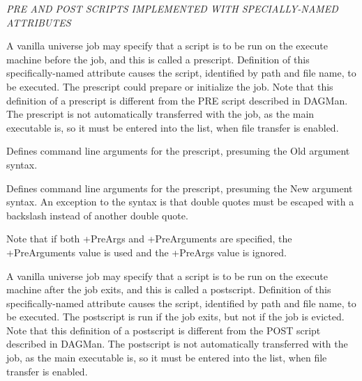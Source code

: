 \emph{PRE AND POST SCRIPTS IMPLEMENTED WITH SPECIALLY-NAMED ATTRIBUTES}
\begin{description} 


\label{man-condor-submit-prescript}
\item[+PreCmd = \texttt{"}$<$executable$>$\texttt{"}]
A vanilla universe job may specify that a script is to be run 
on the execute machine before the job, and this is called a prescript.
Definition of this specifically-named attribute causes the script,
identified by path and file name, to be executed. 
The prescript could prepare or initialize the job.
Note that this definition of a prescript is different from the PRE script 
described in DAGMan.
The prescript is not automatically transferred with the job,
as the main executable is, 
so it must be entered into the  list,
when file transfer is enabled.

\label{man-condor-submit-preargs}
\item[+PreArgs = \texttt{"}$<$argument\_list$>$\texttt{"}]
Defines command line arguments for the prescript, 
presuming the Old argument syntax.

\label{man-condor-submit-prearguments}
\item[+PreArguments = \texttt{"}$<$argument\_list$>$\texttt{"}]
Defines command line arguments for the prescript, 
presuming the New argument syntax.
An exception to the syntax is that double
quotes must be escaped with a backslash instead of another double
quote. 

Note that if both +PreArgs and +PreArguments are specified, the
+PreArguments value is used and the +PreArgs value is ignored.


\label{man-condor-submit-postscript}
\item[+PostCmd = \texttt{"}$<$executable$>$\texttt{"}]
A vanilla universe job may specify that a script is to be run 
on the execute machine after the job exits, and this is called a postscript.
Definition of this specifically-named attribute causes the script,
identified by path and file name, to be executed. 
The postscript is run if the job exits, but not if the job is evicted.
Note that this definition of a postscript is different from the POST script 
described in DAGMan.
The postscript is not automatically transferred with the job,
as the main executable is, 
so it must be entered into the  list,
when file transfer is enabled.


\end{description}
